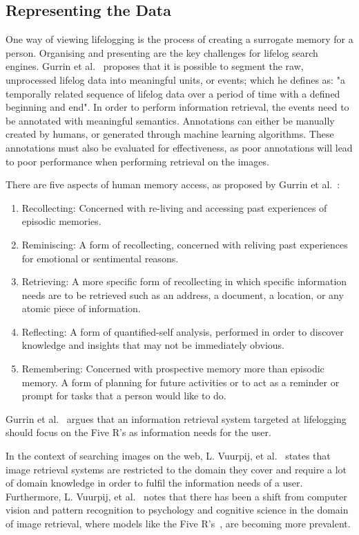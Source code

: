 \subsection{Representing the Data}
One way of viewing lifelogging is the process of creating a surrogate memory for a person. Organising and presenting are the key challenges for lifelog search engines. Gurrin et al.~\cite{gurrin2014lifelogging} proposes that it is possible to segment the raw, unprocessed lifelog data into meaningful units, or events; which he defines as: "a temporally related sequence of lifelog data over a period of time with a defined beginning and end". In order to perform information retrieval, the events need to be annotated with meaningful semantics. Annotations can either be manually created by humans, or generated through machine learning algorithms. These annotations must also be evaluated for effectiveness, as poor annotations will lead to poor performance when performing retrieval on the images.

There are five aspects of human memory access, as proposed by Gurrin et al.~\cite{gurrin2014lifelogging}:
\begin{enumerate}
    \item Recollecting: Concerned with re-living and accessing past experiences of episodic memories.
    \item Reminiscing: A form of recollecting, concerned with reliving past experiences for emotional or sentimental reasons.
    \item Retrieving: A more specific form of recollecting  in which specific information needs are to be retrieved such as an address, a document, a location, or any atomic piece of information.
    \item Reflecting: A form of quantified-self analysis, performed in order to discover knowledge and insights that may not be immediately obvious.
    \item Remembering: Concerned with prospective memory more than episodic memory. A form of planning for future activities or to act as a reminder or prompt for tasks that a person would like to do.
\end{enumerate}
Gurrin et al.~\cite{gurrin2014lifelogging} argues that an information retrieval system targeted at lifelogging should focus on the Five R's as information needs for the user.

In the context of searching images on the web,  L. Vuurpij, et al.~\cite{vuurpij2002vind} states that image retrieval systems are restricted to the domain they cover and require a lot of domain knowledge in order to fulfil the information needs of a user. Furthermore, L. Vuurpij, et al.~\cite{vuurpij2002vind} notes that there has been a shift from computer vision and pattern recognition to psychology and cognitive science in the domain of image retrieval, where models like the Five R's~\cite{gurrin2014lifelogging}, are becoming more prevalent. 

